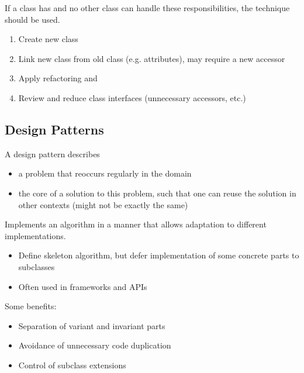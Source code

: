 \documentclass[
../../Software_Engineering_Summary.tex,
]
{subfiles}
\begin{document}
If a class has  and no other class can handle these responsibilities, the  technique should be used.

\begin{defbox}
    \begin{enumerate}
        \item Create new class
        \item Link new class from old class (e.g. attributes), may require a new accessor
        \item Apply refactoring  and 
        \item Review and reduce class interfaces (unnecessary accessors, etc.)
    \end{enumerate}
\end{defbox}

\subsection{Design Patterns}

A design pattern describes 
\begin{itemize}
    \item a problem that reoccurs regularly in the domain
    \item the core of a solution to this problem, such that one can reuse the solution in other contexts (might not be exactly the same)
\end{itemize}

\begin{defbox}
    Implements an algorithm in a manner that allows adaptation to different implementations.

    \begin{itemize}
        \item Define skeleton algorithm, but defer implementation of some concrete parts to subclasses
        \item Often used in frameworks and APIs
    \end{itemize}

    Some benefits:
    \begin{itemize}
        \item Separation of variant and invariant parts
        \item Avoidance of unnecessary code duplication
        \item Control of subclass extensions
    \end{itemize}
    
\end{defbox}
\end{document}

